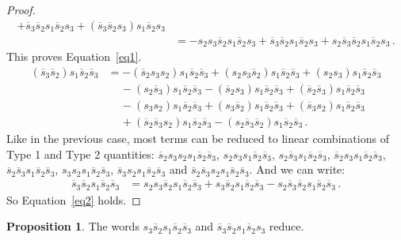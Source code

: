 \documentclass[12pt,reqno]{amsart}
\theoremstyle{definition}
\newtheorem{proposition}[theorem]{Proposition}
\def\hs{\overline{s}}
\begin{document}
\begin{proof}
\begin{align*}
  + \hs_3 \hs_2 s_1 \hs_2 s_3  + (\hs_3 \hs_2 s_3) s_1 \hs_2 s_3\\
  & = - s_2 s_3 \hs_2 s_1 \hs_2 s_3 + \hs_3 \hs_2 s_1 \hs_2 s_3
  + s_2 \hs_3 \hs_2 s_1 \hs_2 s_3 \,.
\end{align*}
This proves Equation~\eqref{eq1}.
\begin{align*}
  (\hs_3 \hs_2) s_1 \hs_2 \hs_3& =  - (\hs_2 s_3 s_2)s_1 \hs_2 \hs_3
  + (s_2 s_3 \hs_2) s_1 \hs_2 \hs_3 + (s_2 s_3) s_1 \hs_2 \hs_3\\
  &\phantom{sii} -(s_2 \hs_3) s_1 \hs_2 \hs_3 - (\hs_2 s_3) s_1 \hs_2 \hs_3
  + (\hs_2 \hs_3) s_1 \hs_2 \hs_3\\
  &\phantom{sii} - (s_3 s_2) s_1 \hs_2 \hs_3 + (s_3 \hs_2) s_1 \hs_2 \hs_3
  + (\hs_3 s_2) s_1 \hs_2 \hs_3 \\
  &\phantom{sii} + (\hs_2 \hs_3 s_2) s_1 \hs_2 \hs_3 - (s_2 \hs_3 \hs_2)
  s_1 \hs_2 \hs_3 \,.
\end{align*}
Like in the previous case, most terms can be reduced to linear combinations
of Type 1 and Type 2 quantities: $\hs_2 s_3 s_2 s_1 \hs_2 \hs_3$, $s_2 s_3 s_1
\hs_2 \hs_3$, $s_2 \hs_3 s_1 \hs_2 \hs_3$, $\hs_2 s_3 s_1 \hs_2 \hs_3$, $\hs_2
\hs_3 s_1 \hs_2 \hs_3$, $s_3 s_2 s_1 \hs_2 \hs_3$, $\hs_3 s_2 s_1 \hs_2 \hs_3$ and
$\hs_2 \hs_3 s_2 s_1 \hs_2 \hs_3$. And we can write:
\begin{align*}
  \hs_3 \hs_2 s_1 \hs_2 \hs_3&   =   s_2 s_3 \hs_2 s_1 \hs_2 \hs_3
  + s_3 \hs_2 s_1 \hs_2 \hs_3 - s_2 \hs_3 \hs_2 s_1 \hs_2 \hs_3 \,.
\end{align*}
So Equation~\eqref{eq2} holds.  
\end{proof}

\begin{proposition}
\label{reductiontwofirst}
The words $s_{3} \hs_2 s_1 \hs_2 \hs_{3}$ and $\hs_{3} \hs_2 s_1 \hs_2 s_{3}$ reduce.
\end{proposition}
\end{document}

